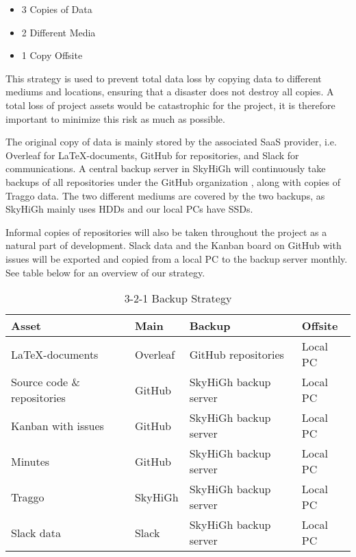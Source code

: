 \begin{itemize}
    \item 3 Copies of Data
    \item 2 Different Media
    \item 1 Copy Offsite
\end{itemize}

This strategy is used to prevent total data loss by copying data to different mediums and locations, ensuring that a disaster does not destroy all copies. A total loss of project assets would be catastrophic for the project, it is therefore important to minimize this risk as much as possible. 

The original copy of data is mainly stored by the associated SaaS provider, i.e. Overleaf for \LaTeX-documents, GitHub for repositories, and Slack for communications. A central backup server in SkyHiGh will continuously take backups of all repositories under the GitHub organization \cite{github_org}, along with copies of Traggo data. The two different mediums are covered by the two backups, as SkyHiGh mainly uses HDDs and our local PCs have SSDs. 

Informal copies of repositories will also be taken throughout the project as a natural part of development. Slack data and the Kanban board on GitHub with issues will be exported and copied from a local PC to the backup server monthly.
See table below for an overview of our strategy. 

\begin{table} [H]
    \centering
    \begin{tabular}{|l|l|l|l|}
    \hline
    \textbf{Asset} & \textbf{Main} & \textbf{Backup} & \textbf{Offsite} \\
    \hline
    \LaTeX-documents & Overleaf & GitHub repositories & Local PC \\
    Source code \& repositories & GitHub \cite{github_org} & SkyHiGh backup server & Local PC \\
    Kanban with issues & GitHub \cite{github_org} & SkyHiGh backup server & Local PC \\
    Minutes & GitHub \cite{github_org} & SkyHiGh backup server & Local PC \\
    Traggo & SkyHiGh & SkyHiGh backup server & Local PC \\
    Slack data & Slack & SkyHiGh backup server & Local PC \\
    \hline
    \end{tabular}
    \caption{3-2-1 Backup Strategy}
    \label{tab:tools}
\end{table}


